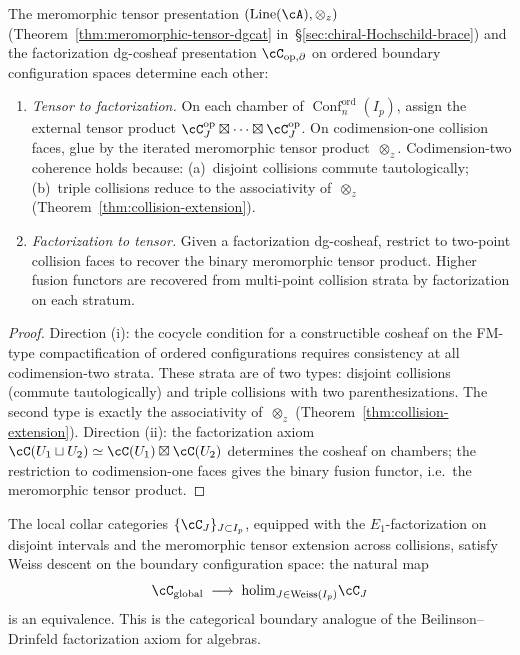 \begin{theorem}[Meromorphic tensor $=$ factorization on the chirally Koszul locus]
\label{thm:meromorphic-factorization-equivalence}
The meromorphic tensor presentation
$(\operatorname{Line}(\cA), \otimes_z)$
\textup{(}Theorem~\textup{\ref{thm:meromorphic-tensor-dgcat}}
in~\S\textup{\ref{sec:chiral-Hochschild-brace}}\textup{)}
and the factorization dg-cosheaf presentation
$\cC_{\mathrm{op},\partial}$ on ordered boundary configuration
spaces determine each other:
\begin{enumerate}[label=\textup{(\roman*)}]
\item \emph{Tensor to factorization.} On each chamber of
 $\operatorname{Conf}_n^{\mathrm{ord}}(I_p)$, assign the
 external tensor product
 $\cC_J^{\mathrm{op}} \boxtimes \cdots \boxtimes
 \cC_J^{\mathrm{op}}$. On codimension-one collision faces,
 glue by the iterated meromorphic tensor product~$\otimes_z$.
 Codimension-two coherence holds because:
 \textup{(a)}~disjoint collisions commute tautologically;
 \textup{(b)}~triple collisions reduce to the associativity
 of~$\otimes_z$
 \textup{(}Theorem~\textup{\ref{thm:collision-extension}}\textup{)}.

\item \emph{Factorization to tensor.} Given a factorization
 dg-cosheaf, restrict to two-point collision faces to recover
 the binary meromorphic tensor product. Higher fusion functors
 are recovered from multi-point collision strata by
 factorization on each stratum.
\end{enumerate}
\end{theorem}

\begin{proof}
Direction (i): the cocycle condition for a constructible cosheaf
on the FM-type compactification of ordered configurations requires
consistency at all codimension-two strata. These strata are of two
types: disjoint collisions (commute tautologically) and triple
collisions with two parenthesizations. The second type is exactly
the associativity of~$\otimes_z$
(Theorem~\ref{thm:collision-extension}).
Direction (ii): the factorization axiom
$\cC(U_1 \sqcup U_2) \simeq \cC(U_1) \boxtimes \cC(U_2)$
determines the cosheaf on chambers; the restriction to
codimension-one faces gives the binary fusion functor, i.e.\
the meromorphic tensor product.
\end{proof}

\begin{conjecture}
\label{conj:weiss-descent}
The local collar categories $\{\cC_J\}_{J \subset I_p}$,
equipped with the $E_1$-factorization on disjoint intervals and the
meromorphic tensor extension across collisions, satisfy Weiss
descent on the boundary configuration space: the natural map
\[
 \cC_{\mathrm{global}}
 \;\longrightarrow\;
 \holim_{J \in \mathrm{Weiss}(I_p)} \cC_J
\]
is an equivalence. This is the categorical boundary analogue of
the Beilinson--Drinfeld factorization axiom for algebras.
\end{conjecture}

